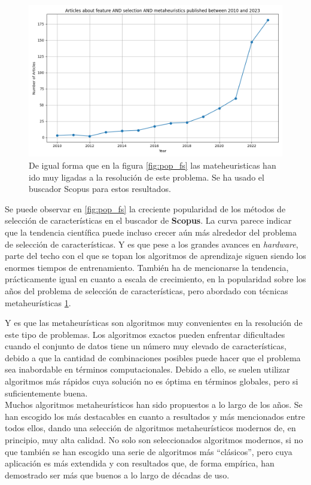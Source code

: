 \begin{figure}[htp]
  \begin{center}
    \includegraphics[width=1\textwidth]{imagenes/scopus_chart2.png}
  \end{center}
  \caption[Popularidad de feature selection + metaheuristics sobre los años]{De igual forma que en la figura \ref{fig:pop_fs} las mateheuristicas han ido muy ligadas a la resolución de este problema. Se ha usado el buscador Scopus para estos resultados.}
  \label{fig:pop_fs2}
\end{figure}

Se puede observar en \ref{fig:pop_fs} la creciente popularidad de los métodos de selección de características en el buscador de \textbf{Scopus}. La curva parece indicar que la tendencia científica puede incluso crecer aún más alrededor del problema de selección de características. Y es que pese a los grandes avances en \textit{hardware}, parte del techo con el que se topan los algoritmos de aprendizaje siguen siendo los enormes tiempos de entrenamiento.
También ha de mencionarse la tendencia, prácticamente igual en cuanto a escala de crecimiento, en la popularidad sobre los años del problema de selección de características, pero abordado con técnicas metaheurísticas \ref{fig:pop_fs2}.

Y es que las metaheurísticas son algoritmos muy convenientes en la resolución de este tipo de problemas. Los algoritmos exactos pueden enfrentar dificultades cuando el conjunto de datos tiene un número muy elevado de características, debido a que la cantidad de combinaciones posibles puede hacer que el problema sea inabordable en términos computacionales. Debido a ello, se suelen utilizar algoritmos más rápidos cuya solución no es óptima en términos globales, pero si suficientemente buena.\\[6pt]
Muchos algoritmos metaheurísticos han sido propuestos a lo largo de los años. Se han escogido los más destacables en cuanto a resultados y más mencionados entre todos ellos, dando una selección de algoritmos metaheurísticos modernos de, en principio, muy alta calidad. No solo son seleccionados algoritmos modernos, si no que también se han escogido una serie de algoritmos más ``clásicos'', pero cuya aplicación es más extendida y con resultados que, de forma empírica, han demostrado ser más que buenos a lo largo de décadas de uso.

